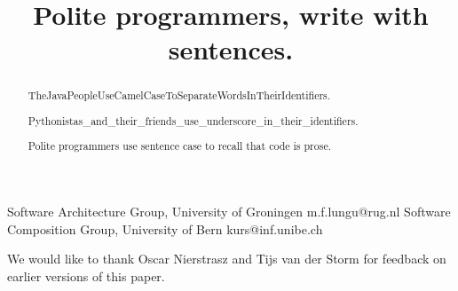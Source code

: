 \documentclass[preprint]{sigplanconf}
\begin{document}
\setlength{\pdfpageheight}{\paperheight}
\setlength{\pdfpagewidth}{\paperwidth}




\title{Polite programmers, write with sentences.}

           {Software Architecture Group,
           University of Groningen}
           {m.f.lungu@rug.nl}
           {Software Composition Group,
           University of Bern}
           {kurs@inf.unibe.ch}

\maketitle

\begin{abstract}

\noindent
TheJavaPeopleUseCamelCaseToSeparateWordsInTheirIdentifiers. 

\noindent
Pythonistas\_and\_their\_friends\_use\_underscore\_in\_their\_identifiers. 

\noindent
Polite programmers use sentence case to recall that code is prose.
\end{abstract}
\vspace {1cm}






\acks
\footnotesize {We would like to thank Oscar Nierstrasz and Tijs van der Storm for feedback on earlier versions of this paper.}










\end{document}
